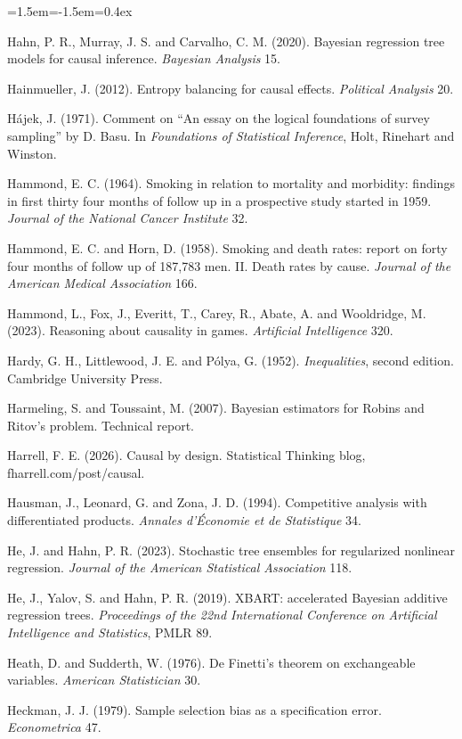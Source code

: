 \begin{list}{}{\leftmargin=1.5em\itemindent=-1.5em\itemsep=0.4ex}
\item Hahn, P. R., Murray, J. S. and Carvalho, C. M. (2020). Bayesian regression tree models for causal inference. \emph{Bayesian Analysis} 15.
\item Hainmueller, J. (2012). Entropy balancing for causal effects. \emph{Political Analysis} 20.
\item H\'ajek, J. (1971). Comment on ``An essay on the logical foundations of survey sampling'' by D. Basu. In \emph{Foundations of Statistical Inference}, Holt, Rinehart and Winston.
\item Hammond, E. C. (1964). Smoking in relation to mortality and morbidity: findings in first thirty four months of follow up in a prospective study started in 1959. \emph{Journal of the National Cancer Institute} 32.
\item Hammond, E. C. and Horn, D. (1958). Smoking and death rates: report on forty four months of follow up of 187,783 men. II. Death rates by cause. \emph{Journal of the American Medical Association} 166.
\item Hammond, L., Fox, J., Everitt, T., Carey, R., Abate, A. and Wooldridge, M. (2023). Reasoning about causality in games. \emph{Artificial Intelligence} 320.
\item Hardy, G. H., Littlewood, J. E. and P\'olya, G. (1952). \emph{Inequalities}, second edition. Cambridge University Press.
\item Harmeling, S. and Toussaint, M. (2007). Bayesian estimators for Robins and Ritov's problem. Technical report.
\item Harrell, F. E. (2026). Causal by design. Statistical Thinking blog, fharrell.com/post/causal.
\item Hausman, J., Leonard, G. and Zona, J. D. (1994). Competitive analysis with differentiated products. \emph{Annales d'\'Economie et de Statistique} 34.
\item He, J. and Hahn, P. R. (2023). Stochastic tree ensembles for regularized nonlinear regression. \emph{Journal of the American Statistical Association} 118.
\item He, J., Yalov, S. and Hahn, P. R. (2019). XBART: accelerated Bayesian additive regression trees. \emph{Proceedings of the 22nd International Conference on Artificial Intelligence and Statistics}, PMLR 89.
\item Heath, D. and Sudderth, W. (1976). De Finetti's theorem on exchangeable variables. \emph{American Statistician} 30.
\item Heckman, J. J. (1979). Sample selection bias as a specification error. \emph{Econometrica} 47.

\end{list}
